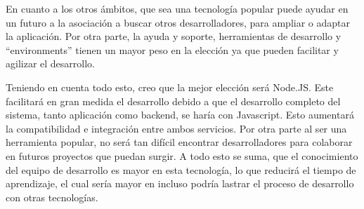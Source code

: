 En cuanto a los otros ámbitos, que sea una tecnología popular puede ayudar en un futuro a la asociación a buscar otros desarrolladores, para ampliar o adaptar la aplicación. Por otra parte, la ayuda y soporte, herramientas de desarrollo y ``environments'' tienen un mayor peso en la elección ya que pueden facilitar y agilizar el desarrollo. 

Teniendo en cuenta todo esto, creo que la mejor elección será Node.JS. Este facilitará en gran medida el desarrollo debido a que el desarrollo completo del sistema, tanto aplicación como backend, se haría con Javascript. Esto aumentará la compatibilidad e integración entre ambos servicios. Por otra parte al ser una herramienta popular, no será tan difícil encontrar desarrolladores para colaborar en futuros proyectos que puedan surgir. A todo esto se suma, que el conocimiento del equipo de desarrollo es mayor en esta tecnología, lo que reducirá el tiempo de aprendizaje, el cual sería mayor en incluso podría lastrar el proceso de desarrollo con otras tecnologías.
